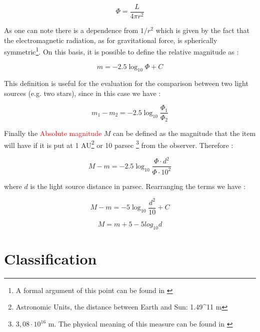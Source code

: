 \documentclass[12pt,%
               a4paper,%
               oneside,openany,%
               titlepage,%
               headinclude,footinclude,%
               BCOR5mm,%
               cleardoublepage=empty,%
               tablecaptionabove,%
               floatperchapter,
               ]{scrreprt}                 %
\begin{document}
\begin{equation}
\Phi=\frac{L}{4\pi r^{2}}
\end{equation}

As one can note there is a dependence from $1/r^{2}$ which is given by the fact that the electromagnetic radiation, as for gravitational force, is spherically symmetric\footnote{A formal argument of this point can be found in \cite{zee2013einstein}}. On this basis, it is possible to define the relative magnitude as \cite{burbine2016asteroids}:

\begin{equation}
m=-2.5\log_{10}\Phi+C
\end{equation}

This definition is useful for the evaluation for the comparison between two light sources (e.g. two stars), since in this case we have \cite{burbine2016asteroids}:

\begin{equation}
m_{1}-m_{2}=-2.5\log_{10}\frac{\Phi_{1}}{\Phi_{2}}
\end{equation}

Finally the \textcolor{red}{Absolute magnitude} $M$ can be defined as the magnitude that the item will have if it is put at 1 AU\footnote{Astronomic Units, the distance between Earth and Sun: 1.49^{11} m} or 10 parsec \footnote{$3,08\cdot 10^{16}$ m. The physical meaning of this measure can be found in \cite{burbine2016asteroids}} from the observer. Therefore  \cite{burbine2016asteroids}:

\begin{equation}
M-m=-2.5\log_{10}\frac{\Phi\cdot d^{2} }{\Phi\cdot 10^{2}}
\end{equation}

where $d$ is the light source distance in parsec. Rearranging the terms we have \cite{burbine2016asteroids}:

\begin{equation}
M-m=-5\log_{10}\frac{ d^{2} }{10}+C
\end{equation}

\begin{equation}
M=m+5-5log_{10}d
\end{equation}



\section{Classification}
\end{document}
